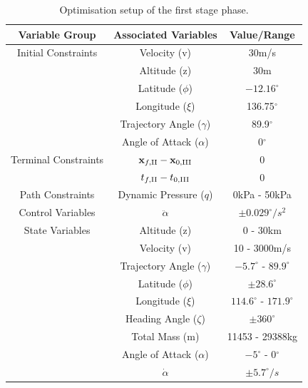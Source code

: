 \begin{table}[ht]
	\centering
	\begin{tabular}{|c|c|c|}
		\hline \textbf{Variable Group}  & \textbf{Associated Variables} & \textbf{Value/Range}\\
		\hline Initial Constraints  & Velocity (v) & 30m/s\\ & Altitude (z)& 30m \\ & Latitude ($\phi$)  & $-12.16^\circ$ \\& Longitude ($\xi$) & 136.75$^\circ$\\ & Trajectory Angle ($\gamma$) & 89.9$^\circ$\\ & Angle of Attack ($\alpha$)& 0$^\circ$\\
		\hline Terminal Constraints & $\textbf{x}_{f,\textrm{\rom{2}}} - \textbf{x}_{0,\textrm{\rom{3}}}$ & 0\\ & $t_{f,\textrm{\rom{2}}} - t_{0,\textrm{\rom{3}}}$ & 0\\
		\hline Path Constraints & Dynamic Pressure ($q$) & 0kPa - 50kPa\\ 
		\hline Control Variables & $\ddot{\alpha}$ & $\pm0.029^\circ/s^2$\\ 
		\hline State Variables & Altitude (z) & 0 - 30km\\ & Velocity (v) & 10 - 3000m/s\\ & Trajectory Angle ($\gamma$)& $-5.7^\circ$ - $89.9^\circ$ \\   & Latitude ($\phi$) & $\pm28.6^\circ$ \\  & Longitude ($\xi$)& $114.6^\circ$ - $171.9^\circ$\\   & Heading Angle ($\zeta$)& $\pm360^\circ$\\  & Total Mass (m)& 11453 - 29388kg \\  & Angle of Attack ($\alpha$)&  $-5^\circ$ - 0$^\circ$\\  & $\dot{\alpha}$& $\pm5.7^\circ/s$\\ 
		\hline 
	\end{tabular} 
	
	\caption{Optimisation setup of the first stage phase. }
	\label{tab:1ststagesetup}
\end{table}



